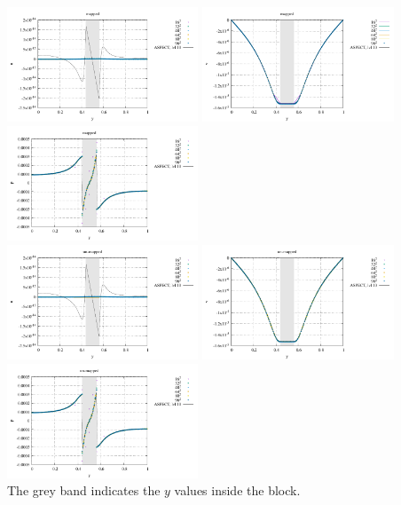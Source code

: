 \begin{center}
\includegraphics[width=5.7cm]{python_codes/fieldstone_76/results/block_rd/profile_m1_u.pdf}
\includegraphics[width=5.7cm]{python_codes/fieldstone_76/results/block_rd/profile_m1_v.pdf}
\includegraphics[width=5.7cm]{python_codes/fieldstone_76/results/block_rd/profile_m1_p.pdf}\\
\includegraphics[width=5.7cm]{python_codes/fieldstone_76/results/block_rd/profile_m2_u.pdf}
\includegraphics[width=5.7cm]{python_codes/fieldstone_76/results/block_rd/profile_m2_v.pdf}
\includegraphics[width=5.7cm]{python_codes/fieldstone_76/results/block_rd/profile_m2_p.pdf}\\
{\captionfont The grey band indicates the $y$ values inside the block.}
\end{center}

